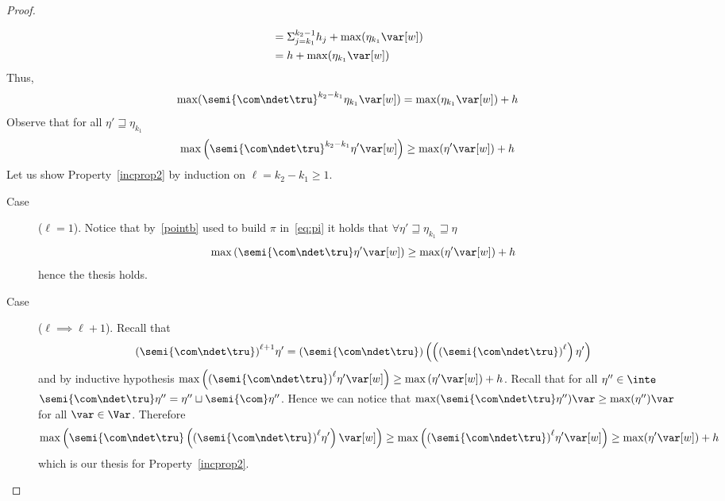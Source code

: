 \begin{proof}
\begin{inductive}
\begin{align*}
                               & = \Sigma_{j=k_1}^{k_2-1} h_j + \max(\eta_{k_1} \var[w])  \\
                               & = h +  \max(\eta_{k_1} \var[w])  
    \end{align*}
    Thus,
    \[\max(\semi{\com \ndet \tru}^{k_2-k_1} \eta_{k_1} \var[w]) = \max(\eta_{k_1}
      \var[w]) + h\] 
    Observe that for all \(\eta' \sqsupseteq \eta_{k_1}\)
    \begin{equation}\label{incprop2}
      \max\left(\semi{\com \ndet \tru}^{k_2-k_1} \eta' \var[w]\right) \geq \max(\eta' \var[w]) + h
    \end{equation}
    Let us show Property~\eqref{incprop2} by induction on \(\ell = k_2-k_1 \geq 1\).

    \begin{description}
    \item[Case] (\(\ell = 1\)).
    Notice that by~\ref{pointb} used to build \(\pi\)
    in~\eqref{eq:pi} it holds that
    \(\forall \eta'\sqsupseteq \eta_{k_1}\sqsupseteq \eta\)
    \begin{equation*}
      \max\left(\semi{\com\ndet\tru}\eta'\var[w]\right) \geq \max(\eta'\var[w]) + h
    \end{equation*}
    hence the thesis holds.

    \item[Case] (\(\ell \implies \ell + 1\)).
    Recall that
    \begin{equation*}
      {\left(\semi{\com\ndet\tru}\right)}^{\ell + 1}\eta' = {\left(\semi{\com\ndet\tru}\right)}\left(\left({\left(\semi{\com\ndet\tru}\right)}^\ell\right)\eta'\right)
    \end{equation*}
    and by inductive hypothesis
    \(\max\left({\left(\semi{\com\ndet\tru}\right)}^\ell\eta'\var[w]\right)
    \geq \max\left(\eta'\var[w]\right) + h\). Recall that for all
    \(\eta'' \in \inte\)
    \(\semi{\com\ndet \tru}\eta'' = \eta '' \sqcup \semi{\com}\eta''\).
    Hence we can notice that
    \(\max(\semi{\com\ndet\tru}\eta'')\var \geq \max(\eta'')\var\) for
    all \(\var \in \Var\). Therefore
    \begin{equation*}
      \max\left(\semi{\com\ndet\tru}\left({(\semi{\com\ndet\tru})}^\ell\eta'\right)\var[w]\right) \geq \max\left({(\semi{\com\ndet\tru})}^\ell\eta'\var[w]\right) \geq \max(\eta'\var[w]) + h
    \end{equation*}
    which is our thesis for Property~\eqref{incprop2}.
    \end{description}
    

\end{inductive}
\end{proof}
